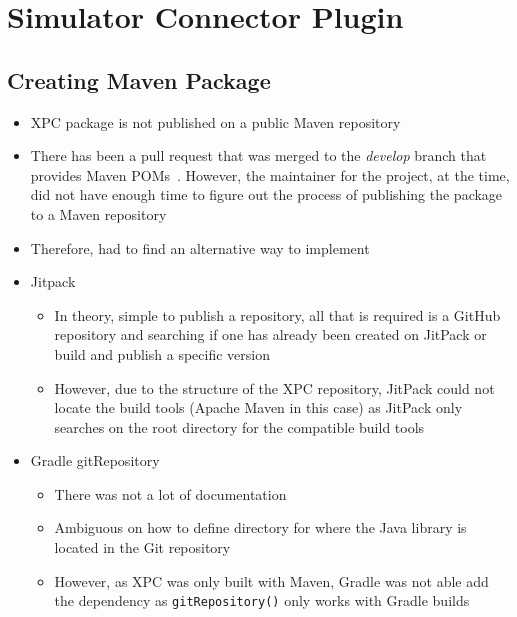 \documentclass[../dissertation.tex]{subfiles}
\begin{document}
\section{Simulator Connector Plugin}


\subsection{Creating Maven Package}
\begin{itemize}
  \item XPC package is not published on a public Maven repository
  \item There has been a pull request that was merged to the \textit{develop} branch
    that provides Maven POMs~\cite{xpc:pom}. However, the maintainer for the
    project, at the time, did not have enough time to figure out the process of
    publishing the package to a Maven repository~\cite{xpc:pom-time}
  \item Therefore, had to find an alternative way to implement
  \item Jitpack~\cite{jitpack}
  \begin{itemize}
    \item In theory, simple to publish a repository, all that is required is a GitHub
      repository and searching if one has already been created on JitPack or build and publish
      a specific version
    \item However, due to the structure of the XPC repository, JitPack could not locate the
      build tools (Apache Maven in this case) as JitPack only searches on the root directory
      for the compatible build tools
  \end{itemize}
  \item Gradle gitRepository~\cite{gradle:gitRepository}
  \begin{itemize}
    \item There was not a lot of documentation
    \item Ambiguous on how to define directory for where the Java library is located in the Git repository
    \item However, as XPC was only built with Maven, Gradle was not able add the dependency as \verb|gitRepository()|
      only works with Gradle builds~\cite{gradle:gitRepoGradleOnly}
  \end{itemize}

\end{itemize}
\end{document}
